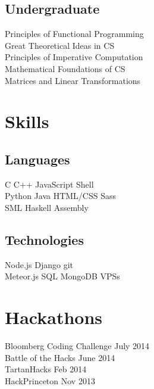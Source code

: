 \documentclass[]{deedy-resume-openfont}
\begin{document}
\begin{minipage}[t]{0.33\textwidth}
\subsection{Undergraduate}
Principles of Functional Programming \\
Great Theoretical Ideas in CS \\
Principles of Imperative Computation \\
Mathematical Foundations of CS \\
Matrices and Linear Transformations \\
\sectionsep


\section{Skills}
\subsection{Languages}
C \textbullet{} C++ \textbullet{} JavaScript \textbullet{} Shell \\
Python \textbullet{} Java \textbullet{} HTML/CSS \textbullet{} Sass \\
SML \textbullet{} Haskell \textbullet{} Assembly \\
\sectionsep

\subsection{Technologies}
Node.js \textbullet{} Django \textbullet{} git \\
Meteor.js \textbullet{} SQL \textbullet{} MongoDB \textbullet{} VPSs
\sectionsep


\section{Hackathons} 
Bloomberg Coding Challenge \textbullet{} July 2014 \\
Battle of the Hacks \textbullet{} June 2014 \\
TartanHacks \textbullet{} Feb 2014 \\
HackPrinceton \textbullet{} Nov 2013 \\
\sectionsep

%
%

\end{minipage} 
\end{document}
